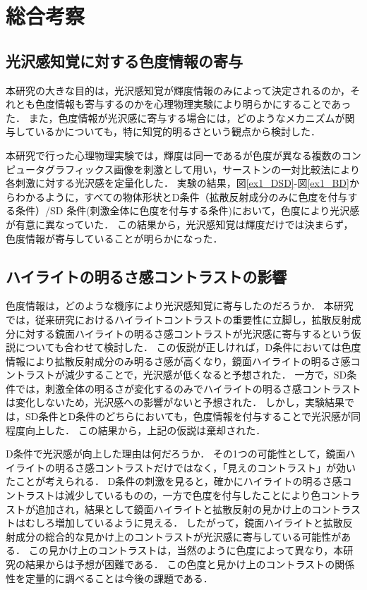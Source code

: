 \chapter{総合考察}
    \section{光沢感知覚に対する色度情報の寄与}
        本研究の大きな目的は，光沢感知覚が輝度情報のみによって決定されるのか，それとも色度情報も寄与するのかを心理物理実験により明らかにすることであった．
        また，色度情報が光沢感に寄与する場合には，どのようなメカニズムが関与しているかについても，特に知覚的明るさという観点から検討した．
        
        本研究で行った心理物理実験では，輝度は同一であるが色度が異なる複数のコンピュータグラフィックス画像を刺激として用い，サーストンの一対比較法により各刺激に対する光沢感を定量化した．
        実験の結果，図\ref{ex1_DSD}-図\ref{ex1_BD}からわかるように，すべての物体形状とD条件（拡散反射成分のみに色度を付与する条件）/SD 条件(刺激全体に色度を付与する条件)において，色度により光沢感が有意に異なっていた．
        この結果から，光沢感知覚は輝度だけでは決まらず，色度情報が寄与していることが明らかになった．

    \section{ハイライトの明るさ感コントラストの影響}
        色度情報は，どのような機序により光沢感知覚に寄与したのだろうか．
        本研究では，従来研究におけるハイライトコントラストの重要性に立脚し，拡散反射成分に対する鏡面ハイライトの明るさ感コントラストが光沢感に寄与するという仮説についても合わせて検討した．
        この仮説が正しければ，D条件においては色度情報により拡散反射成分のみ明るさ感が高くなり，鏡面ハイライトの明るさ感コントラストが減少することで，光沢感が低くなると予想された．
        一方で，SD条件では，刺激全体の明るさが変化するのみでハイライトの明るさ感コントラストは変化しないため，光沢感への影響がないと予想された．
        しかし，実験結果では，SD条件とD条件のどちらにおいても，色度情報を付与することで光沢感が同程度向上した．
        この結果から，上記の仮説は棄却された．

        D条件で光沢感が向上した理由は何だろうか．
        その1つの可能性として，鏡面ハイライトの明るさ感コントラストだけではなく，「見えのコントラスト」が効いたことが考えられる．
        D条件の刺激を見ると，確かにハイライトの明るさ感コントラストは減少しているものの，一方で色度を付与したことにより色コントラストが追加され，結果として鏡面ハイライトと拡散反射の見かけ上のコントラストはむしろ増加しているように見える．
        したがって，鏡面ハイライトと拡散反射成分の総合的な見かけ上のコントラストが光沢感に寄与している可能性がある．
        この見かけ上のコントラストは，当然のように色度によって異なり，本研究の結果からは予想が困難である．
        この色度と見かけ上のコントラストの関係性を定量的に調べることは今後の課題である．

